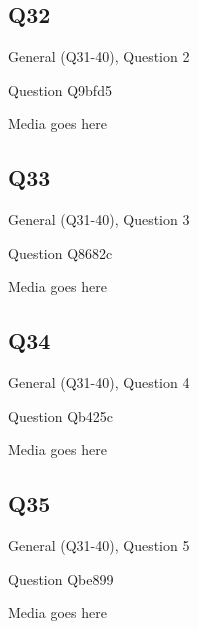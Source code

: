 \documentclass[11pt]{beamer}
\begin{document}
\subsection*{Q32}
\begin{frame}[t]{General (Q31-40), Question 2}
\vspace{2em}
\begin{block}{Question}
Q9bfd5
\end{block}
\begin{center}
Media goes here
\end{center}
\end{frame}
    

\subsection*{Q33}
\begin{frame}[t]{General (Q31-40), Question 3}
\vspace{2em}
\begin{block}{Question}
Q8682c
\end{block}
\begin{center}
Media goes here
\end{center}
\end{frame}
    

\subsection*{Q34}
\begin{frame}[t]{General (Q31-40), Question 4}
\vspace{2em}
\begin{block}{Question}
Qb425c
\end{block}
\begin{center}
Media goes here
\end{center}
\end{frame}
    

\subsection*{Q35}
\begin{frame}[t]{General (Q31-40), Question 5}
\vspace{2em}
\begin{block}{Question}
Qbe899
\end{block}
\begin{center}
Media goes here
\end{center}
\end{frame}
    
\end{document}
